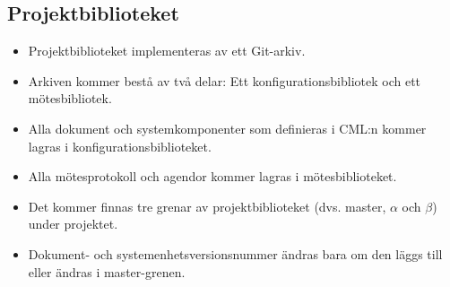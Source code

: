 \documentclass[paper=a4, fontsize=11pt,twoside]{article}
\begin{document}
\subsection*{Projektbiblioteket}
\begin{itemize}
\item Projektbiblioteket implementeras av ett Git-arkiv.
\item Arkiven kommer bestå av två delar: Ett konfigurationsbibliotek och ett mötesbibliotek.
\item Alla dokument och systemkomponenter som definieras i CML:n kommer lagras i konfigurationsbiblioteket.
\item Alla mötesprotokoll och agendor kommer lagras i mötesbiblioteket.
\item Det kommer finnas tre grenar av projektbiblioteket (dvs. master,
  $\alpha$ och $\beta$) under projektet.
\item Dokument- och systemenhetsversionsnummer ändras bara om den läggs till
eller ändras i master-grenen.
\end{itemize}
\end{document}
